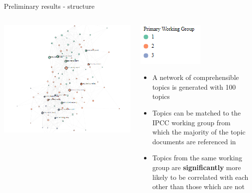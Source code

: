 \documentclass[9pt]{beamer}
\begin{document}
\begin{frame}{Preliminary results - structure}

\begin{columns}
	\begin{column}{0.65\linewidth}
		\begin{center}	
			\vspace*{-0.1\linewidth}
			\includegraphics[width=1.1\linewidth]{../plots/network_wg_372.PNG}
		\end{center}
	\end{column}
	\begin{column}{0.35\linewidth}
		\includegraphics[width=0.4\linewidth]{../plots/network_wg_key.PNG}
		\begin{center}
			\begin{itemize}
				\item A network of comprehensible topics is generated with 100 topics
				\item Topics can be matched to the IPCC working group from which the majority of the topic documents are referenced in
				\item Topics from the same working group are \textbf{significantly} more likely to be correlated with each other than those which are not
			\end{itemize}
		\end{center}
	\end{column}
\end{columns}

\end{frame}
\end{document}
